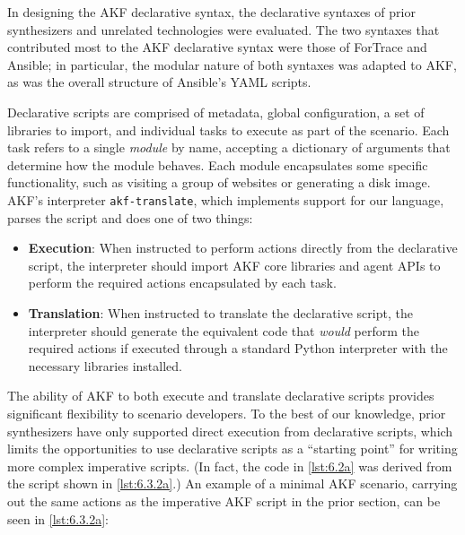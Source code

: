 \documentclass[final,5p,times,twocolumn]{elsarticle}
\newcommand{\passthrough}[1]{#1}
\begin{document}
In designing the AKF declarative syntax, the declarative syntaxes of
prior synthesizers and unrelated technologies were evaluated. The two
syntaxes that contributed most to the AKF declarative syntax were those
of ForTrace and Ansible; in particular, the modular nature of both
syntaxes was adapted to AKF, as was the overall structure of Ansible's
YAML scripts.

Declarative scripts are comprised of metadata, global configuration, a
set of libraries to import, and individual tasks to execute as part of
the scenario. Each task refers to a single \emph{module} by name,
accepting a dictionary of arguments that determine how the module
behaves. Each module encapsulates some specific functionality, such as
visiting a group of websites or generating a disk image. AKF's
interpreter \passthrough{\lstinline!akf-translate!}, which implements
support for our language, parses the script and does one of two things:

\begin{itemize}
\item
  \textbf{Execution}: When instructed to perform actions directly from
  the declarative script, the interpreter should import AKF core
  libraries and agent APIs to perform the required actions encapsulated
  by each task.
\item
  \textbf{Translation}: When instructed to translate the declarative
  script, the interpreter should generate the equivalent code that
  \emph{would} perform the required actions if executed through a
  standard Python interpreter with the necessary libraries installed.
\end{itemize}

The ability of AKF to both execute and translate declarative scripts
provides significant flexibility to scenario developers. To the best of
our knowledge, prior synthesizers have only supported direct execution
from declarative scripts, which limits the opportunities to use
declarative scripts as a ``starting point'' for writing more complex
imperative scripts. (In fact, the code in \autoref{lst:6.2a} was derived
from the script shown in \autoref{lst:6.3.2a}.) An example of a minimal
AKF scenario, carrying out the same actions as the imperative AKF script
in the prior section, can be seen in \autoref{lst:6.3.2a}:
\end{document}
